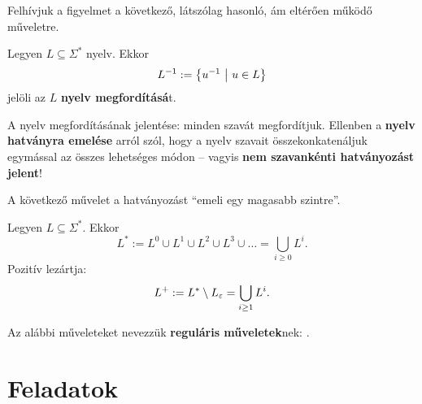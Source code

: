 Felhívjuk a figyelmet a következő, látszólag hasonló, ám eltérően működő műveletre.

\begin{tcolorbox}
	\begin{definition}
		Legyen $L \subseteq \Sigma^*$ nyelv. Ekkor
		\[ L^{-1} := \left\{ u^{-1} ~ \middle\vert ~ u \in L \right\} \]
		jelöli az $L$ \textbf{nyelv megfordításá}t.
	\end{definition}
\end{tcolorbox}

A nyelv megfordításának jelentése: minden szavát megfordítjuk. Ellenben a \textbf{nyelv hatványra emelése} arról szól, hogy a nyelv szavait összekonkatenáljuk egymással az összes lehetséges módon -- vagyis \textbf{nem szavankénti hatványozást jelent}!

A következő művelet a hatványozást ``emeli egy magasabb szintre''.

\begin{tcolorbox}
	\begin{definition}
		Legyen $L \subseteq \Sigma^*$. Ekkor \[ L^* := L^0 \cup L^1 \cup L^2 \cup L^3 \cup \dots = \bigcup_{i \geq 0} L^i . \] Pozitív lezártja: \[ L^+ := L^* \setminus L_\varepsilon = \bigcup_{i \geq 1} L^i . \]
	\end{definition}
\end{tcolorbox}

Az alábbi műveleteket nevezzük \textbf{reguláris műveletek}nek: .

\iffalse

\section{Feladatok}

